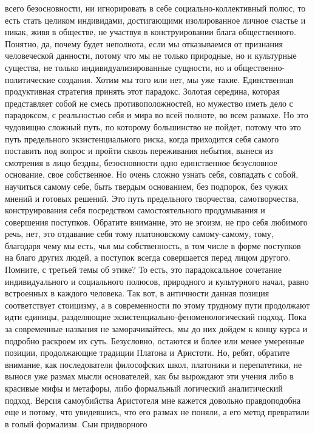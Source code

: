 всего безосновности, ни игнорировать в себе социально-коллективный полюс, то
есть стать целиком индивидами, достигающими изолированное личное счастье и
никак, живя в обществе, не участвуя в конструировании блага общественного.
Понятно, да, почему будет неполнота, если мы отказываемся от признания
человеческой данности, потому что мы не только природные, но и культурные
существа, не только индивидуализированные сущности, но и общественно-
политические создания. Хотим мы того или нет, мы уже такие. Единственная
продуктивная стратегия принять этот парадокс. Золотая середина, которая
представляет собой не смесь противоположностей, но мужество иметь дело с
парадоксом, с реальностью себя и мира во всей полноте, во всем размахе. Но это
чудовищно сложный путь, по которому большинство не пойдет, потому что это путь
предельного экзистенциального риска, когда приходится себя самого поставить под
вопрос и пройти сквозь переживания небытия, вынеся из смотрения в лицо бездны,
безосновности одно единственное безусловное основание, свое собственное. Но
очень сложно узнать себя, совпадать с собой, научиться самому себе, быть твердым
основанием, без подпорок, без чужих мнений и готовых решений. Это путь
предельного творчества, самотворчества, конструирования себя посредством
самостоятельного продумывания и совершения поступков. Обратите внимание, это не
эгоизм, не про себя любимого речь, нет, это отдавание себя тому платоновскому
самому-самому, тому, благодаря чему мы есть, чья мы собственность, в том числе в
форме поступков на благо других людей, а поступок всегда совершается перед лицом
другого. Помните, с третьей темы об этике? То есть, это парадоксальное сочетание
индивидуального и социального полюсов, природного и культурного начал, равно
встроенных в каждого человека. Так вот, в античности данная позиция
соответствует стоицизму, а в современности по этому трудному пути продолжают
идти единицы, разделяющие экзистенциально-феноменологический подход. Пока за
современные названия не заморачивайтесь, мы до них дойдем к концу курса и
подробно раскроем их суть. Безусловно, остаются и более или менее умеренные
позиции, продолжающие традиции Платона и Аристоти. Но, ребят, обратите внимание,
как последователи философских школ, платоники и перепатетики, не вынося уже
размах мысли основателей, как бы вырождают эти учения либо в красивые мифы и
метафоры, либо формальный логический аналитический подход. Версия самоубийства
Аристотеля мне кажется довольно правдоподобна еще и потому, что увидевшись, что
его размах не поняли, а его метод превратили в голый формализм. Сын придворного
